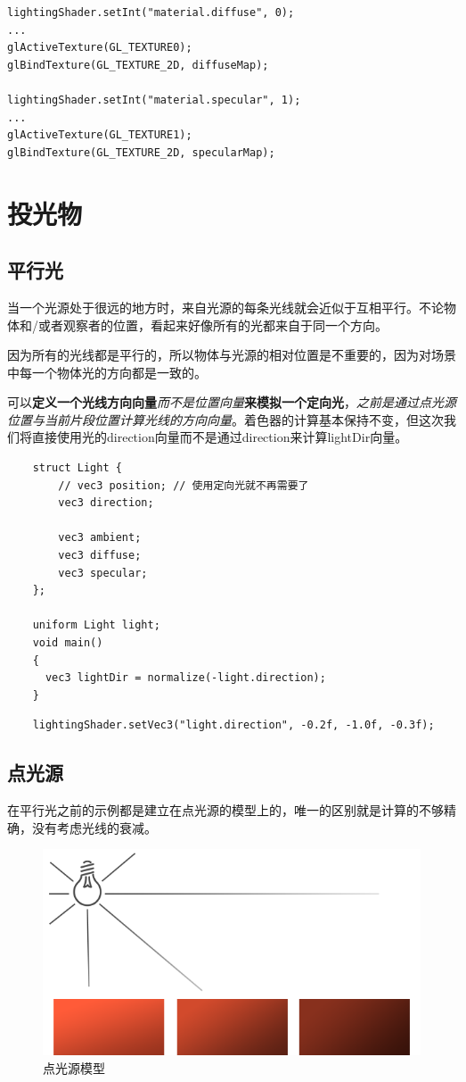 \documentclass[UTF8,a4paper,12pt]{ctexbook}
\begin{document}
			
			\begin{lstlisting}
lightingShader.setInt("material.diffuse", 0);
...
glActiveTexture(GL_TEXTURE0);
glBindTexture(GL_TEXTURE_2D, diffuseMap);			
			
lightingShader.setInt("material.specular", 1);
...
glActiveTexture(GL_TEXTURE1);
glBindTexture(GL_TEXTURE_2D, specularMap);			
			\end{lstlisting}
				
			
			
	\section{投光物}
		\subsection{平行光}
			当一个光源处于很远的地方时，来自光源的每条光线就会近似于互相平行。不论物体和/或者观察者的位置，看起来好像所有的光都来自于同一个方向。
			
			因为所有的光线都是平行的，所以物体与光源的相对位置是不重要的，因为对场景中每一个物体光的方向都是一致的。
			
			可以\textbf{定义一个光线方向向量}\textit{而不是位置向量}\textbf{来模拟一个定向光}，\textit{之前是通过点光源位置与当前片段位置计算光线的方向向量}。着色器的计算基本保持不变，但这次我们将直接使用光的direction向量而不是通过direction来计算lightDir向量。
			
			\begin{lstlisting}
	struct Light {
	    // vec3 position; // 使用定向光就不再需要了
	    vec3 direction;
	
	    vec3 ambient;
	    vec3 diffuse;
	    vec3 specular;
	};
	
	uniform Light light;
	void main()
	{
	  vec3 lightDir = normalize(-light.direction);
	}			
			\end{lstlisting}
			
			\begin{lstlisting}
	lightingShader.setVec3("light.direction", -0.2f, -1.0f, -0.3f);			
			\end{lstlisting}
			
		\subsection{点光源}
			在平行光之前的示例都是建立在点光源的模型上的，唯一的区别就是计算的不够精确，没有考虑光线的衰减。
			
			\begin{figure}[H]
				\centering
				\includegraphics[width=.69\linewidth]{light_casters_point}
				\caption{点光源模型}
			\end{figure}
			
\end{document}
